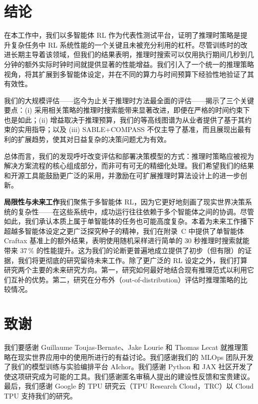 \documentclass[11pt,UTF8,fontset=fandol]{ctexart}
\begin{document}
\section{结论}

在本工作中，我们以多智能体 RL 作为代表性测试平台，证明了推理时策略是提升复杂任务中 RL 系统性能的一个关键且未被充分利用的杠杆。尽管训练时的改进长期主导着该领域，但我们的结果表明，推理时搜索可以仅用执行期间几秒到几分钟的额外实际时钟时间就提供显著的性能增益。我们引入了一个统一的推理策略视角，将其扩展到多智能体设定，并在不同的算力与时间预算下经验性地验证了其有效性。

我们的大规模评估——迄今为止关于推理时方法最全面的评估——揭示了三个关键要点：(i) 采用相关策略的推理时搜索能带来显著改进，即便在严格的时间约束下也是如此；(ii) 增益取决于推理预算，我们的等高线图谱为从业者提供了基于其约束的实用指导；以及 (iii) SABLE+COMPASS 不仅主导了基准，而且展现出最有利的扩展趋势，使其对日益复杂的决策问题尤为有效。

总体而言，我们的发现呼吁改变评估和部署决策模型的方式：推理时策略应被视为解决方案流程的核心组成部分，而非可有可无的精细化处理。我们希望我们的结果和开源工具能鼓励更广泛的采用，并激励在可扩展推理时算法设计上的进一步创新。

\textbf{局限性与未来工作}\quad 我们聚焦于多智能体 RL，因为它更好地刻画了现实世界决策系统的复杂性——在这些系统中，成功运行往往依赖于多个智能体之间的协调。尽管如此，我们承认本质上属于单智能体的任务也可能高度复杂。本着为未来工作播下超越多智能体设定之更广泛探究种子的精神，我们在附录~C 中提供了单智能体 Craftax 基准上的额外结果，表明使用随机采样进行简单的 30 秒推理时搜索就能带来 37\,\% 的性能提升。这为我们的论断更普遍地成立提供了初步（但有限）的证据，我们将更彻底的研究留待未来工作。除了更广泛的 RL 设定之外，我们打算研究两个主要的未来研究方向。第一，研究如何最好地结合现有推理范式以利用它们互补的优势。第二，研究在分布外（out-of-distribution）评估时推理策略的比较情况。

\section*{致谢}

我们要感谢 Guillaume Toujas-Bernate、Jake Lourie 和 Thomas Lecat 就推理策略在现实世界应用中的使用所进行的有益讨论。我们感谢我们的 MLOps 团队开发了我们的模型训练与实验编排平台 AIchor。我们感谢 Python 和 JAX 社区开发了使这项研究成为可能的工具。我们感谢匿名审稿人提出的建设性反馈和宝贵建议。最后，我们感谢 Google 的 TPU 研究云（TPU Research Cloud，TRC）以 Cloud TPU 支持我们的研究。
\end{document}
